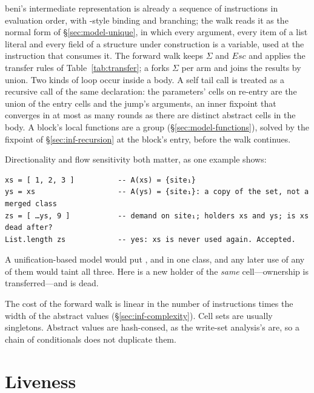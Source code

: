 beni's intermediate representation is already a sequence of instructions in evaluation order, with
-style binding and  branching; the walk reads it as the normal form of
\S\ref{sec:model-unique}, in which every argument, every item of a list literal and every field of a
structure under construction is a variable, used at the instruction that consumes it. The forward walk
keeps $\Sigma$ and $\mathit{Esc}$ and applies the transfer rules of Table~\ref{tab:transfer}; a
 forks $\Sigma$ per arm and joins the results by union. Two kinds of loop occur inside a body.
A self tail call is treated as a recursive call of the same declaration: the parameters' cells on
re-entry are the union of the entry cells and the jump's arguments, an inner fixpoint that converges in
at most as many rounds as there are distinct abstract cells in the body. A block's local functions are a
group (\S\ref{sec:model-functions}), solved by the fixpoint of \S\ref{sec:inf-recursion} at the block's
entry, before the walk continues.

Directionality and flow sensitivity both matter, as one example shows:
\begin{Verbatim}
xs = [ 1, 2, 3 ]          -- A(xs) = {site₁}
ys = xs                   -- A(ys) = {site₁}: a copy of the set, not a merged class
zs = [ …ys, 9 ]           -- demand on site₁; holders xs and ys; is xs dead after?
List.length zs            -- yes: xs is never used again. Accepted.
\end{Verbatim}
A unification-based model would put ,  and  in one class, and any later use
of any of them would taint all three. Here  is a new holder of the \emph{same} cell---ownership
is transferred---and  is dead.

The cost of the forward walk is linear in the number of instructions times the width of the
abstract values (\S\ref{sec:inf-complexity}). Cell sets are usually singletons. Abstract values are
hash-consed, as the write-set analysis's are, so a chain of conditionals does not duplicate them.

\section{Liveness}
\label{sec:inf-liveness}

